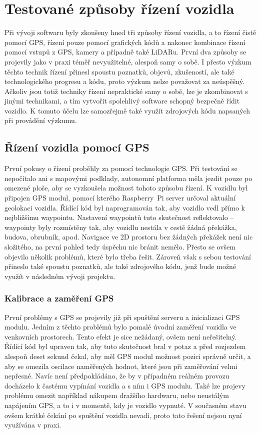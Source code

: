\documentclass[czech, bachelor]{diploma}
\begin{document}
\chapter{Testované způsoby řízení vozidla} \label{driving-methods}

Při vývoji softwaru byly zkoušeny hned tři způsoby řízení vozidla, a to řízení čistě pomocí GPS, řízení pouze pomocí grafických
kódů a nakonec kombinace řízení pomocí vstupů z GPS, kamery a případně také LiDARu. První dva způsoby se projevily jako v praxi
téměř nevyužitelné, alespoň samy o sobě. I přesto výzkum těchto technik řízení přinesl spoustu poznatků, objevů, zkušeností, ale
také technologického progresu a kódu, proto výzkum nelze považovat za neúspěšný. Ačkoliv jsou totiž techniky řízení nepraktické
samy o sobě, lze je zkombinovat s jinými technikami, a tím vytvořit spolehlivý software schopný bezpečně řídit vozidlo. K tomuto
účelu lze samozřejmě také využít zdrojových kódu napsaných při provádění výzkumu.

\section{Řízení vozidla pomocí GPS} \label{gps-failure}

První pokusy o řízení proběhly za pomocí technologie GPS. Při testování se nepočítalo ani s mapovými podklady, autonomní platforma
měla jezdit pouze po omezené ploše, aby se vyzkoušela možnost tohoto způsobu řízení. K vozidlu byl připojen GPS modul, pomocí
kterého Raspberry~Pi server určoval aktuální geolokaci vozidla. Řídící kód byl naprogramován tak, aby vozidlo vedl přímo
k nejbližšímu waypointu. Nastavení waypointů tuto skutečnost reflektovalo -- waypointy byly rozmístěny tak, aby vozidlu nestála
v cestě žádná překážka, budova, obrubník, apod. Navigace ve 2D prostoru bez žádných překážek není nic složitého, na první pohled
tedy úspěchu nic bránit nemělo. Přesto se ovšem objevilo několik problémů, které bylo třeba řešit. Zároveň však s sebou testování
přineslo také spoustu poznatků, ale také zdrojového kódu, jenž bude možné využít v následném vývoji projektu.

\subsection{Kalibrace a zaměření GPS}

První problémy s GPS se projevily již při spuštění serveru a inicializaci GPS modulu. Jedním z těchto problémů bylo pomalé úvodní
zaměření vozidla ve venkovních prostorech. Tento efekt je sice nežádaný, ovšem není neřešitelný. Řídící kód byl upraven tak, aby
tuto skutečnost bral v potaz a před rozjezdem alespoň deset sekund čekal, aby měl GPS modul možnost pozici správně určit, a aby se
omezila oscilace naměřených hodnot, které jsou při zaměřování velmi nepřesné. Navíc není předpokládáno, že by v případném reálném
provozu docházelo k častému vypínání vozidla a s ním i GPS modulu. Také lze projevy problému omezit například nákupem dražšího
hardwaru, nebo neustálým napájením GPS, a to i v momentě, kdy je vozidlo vypnuté. V současném stavu ovšem krátké čekání
po spuštění vozidla nevadí, proto tato řešení nejsou nyní využívána v praxi.
\end{document}
